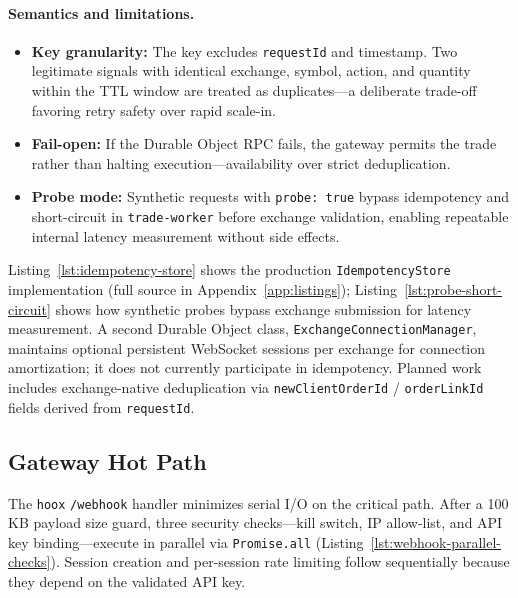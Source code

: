 \paragraph{Semantics and limitations.}
\begin{itemize}
  \item \textbf{Key granularity:} The key excludes \texttt{requestId} and timestamp. Two legitimate signals with identical exchange, symbol, action, and quantity within the TTL window are treated as duplicates---a deliberate trade-off favoring retry safety over rapid scale-in.
  \item \textbf{Fail-open:} If the Durable Object RPC fails, the gateway permits the trade rather than halting execution---availability over strict deduplication.
  \item \textbf{Probe mode:} Synthetic requests with \texttt{probe: true} bypass idempotency and short-circuit in \texttt{trade-worker} before exchange validation, enabling repeatable internal latency measurement without side effects.
\end{itemize}

Listing~\ref{lst:idempotency-store} shows the production \texttt{IdempotencyStore} implementation (full source in Appendix~\ref{app:listings}); Listing~\ref{lst:probe-short-circuit} shows how synthetic probes bypass exchange submission for latency measurement. A second Durable Object class, \texttt{ExchangeConnectionManager}, maintains optional persistent WebSocket sessions per exchange for connection amortization; it does not currently participate in idempotency. Planned work includes exchange-native deduplication via \texttt{newClientOrderId} / \texttt{orderLinkId} fields derived from \texttt{requestId}.


\subsection{Gateway Hot Path}

The \texttt{hoox} \texttt{/webhook} handler minimizes serial I/O on the critical path. After a 100\,KB payload size guard, three security checks---kill switch, IP allow-list, and API key binding---execute in parallel via \texttt{Promise.all} (Listing~\ref{lst:webhook-parallel-checks}). Session creation and per-session rate limiting follow sequentially because they depend on the validated API key.

